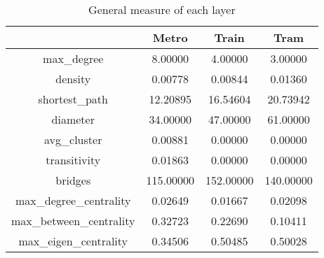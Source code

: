 \begin{table}
\centering
\caption{General measure of each layer}
\label{table:measures}
\begin{tabular}{cccc}
\toprule
{} &      Metro &      Train &       Tram \\
\midrule
max\_degree             &    8.00000 &    4.00000 &    3.00000 \\
density                &    0.00778 &    0.00844 &    0.01360 \\
shortest\_path          &   12.20895 &   16.54604 &   20.73942 \\
diameter               &   34.00000 &   47.00000 &   61.00000 \\
avg\_cluster            &    0.00881 &    0.00000 &    0.00000 \\
transitivity           &    0.01863 &    0.00000 &    0.00000 \\
bridges                &  115.00000 &  152.00000 &  140.00000 \\
max\_degree\_centrality  &    0.02649 &    0.01667 &    0.02098 \\
max\_between\_centrality &    0.32723 &    0.22690 &    0.10411 \\
max\_eigen\_centrality   &    0.34506 &    0.50485 &    0.50028 \\
\bottomrule
\end{tabular}
\end{table}

